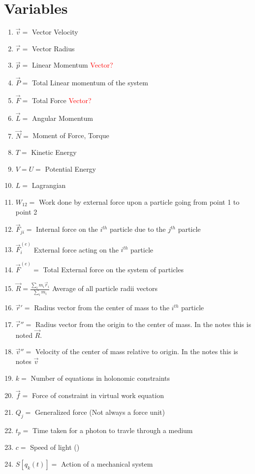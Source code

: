 \documentclass[12pt]{article}
\begin{document}
\section{Variables}
    \begin{enumerate}
        \item $\vec{v} = $ Vector Velocity 
        \item $\vec{r} = $ Vector Radius
        \item $\vec{p} = $ Linear Momentum \textcolor{red}{Vector?}
        \item $\vec{P} = $ Total Linear momentum of the system
        \item $\vec{F} = $ Total Force \textcolor{red}{Vector?}
        \item $\vec{L} =$ Angular Momentum
        \item $\vec{N} = $ Moment of Force, Torque
        \item $T = $ Kinetic Energy
        \item $V = U = $ Potential Energy
        \item $L = $ Lagrangian
        \item $W_{12} = $ Work done by external force upon a particle going from point 1 to point 2
        \item $\vec{F}_{ji} = $ Internal force on the $i^{th}$ particle due to the $j^{th}$ particle
        \item $\vec{F}_i^{(e)}$ External force acting on the $i^{th}$ particle
        \item $\vec{F}^{(e)} = $ Total External force on the system of particles
        \item $\vec{R} = \frac{\sum_i m_i \vec{r}_i}{\sum_i m_i}$ Average of all particle radii vectors
        \item $\vec{r}' = $ Radius vector from the center of mass to the $i^{th}$ particle
        \item $\vec{r}'' = $ Radius vector from the origin to the center of mass. In the notes this is noted $\vec{R}$.
        \item $\vec{v}'' = $ Velocity of the center of mass relative to origin. In the notes this is notes $\vec{v}$
        \item $k = $ Number of equations in holonomic constraints
        \item $\vec{f} = $ Force of constraint in virtual work equation
        \item $Q_j = $ Generalized force (Not always a force unit)
        \item $t_p = $ Time taken for a photon to travle through a medium
        \item $c = $ Speed of light ()
        \item $S[q_k(t)] = $ Action of a mechanical system
    \end{enumerate}
\end{document}
